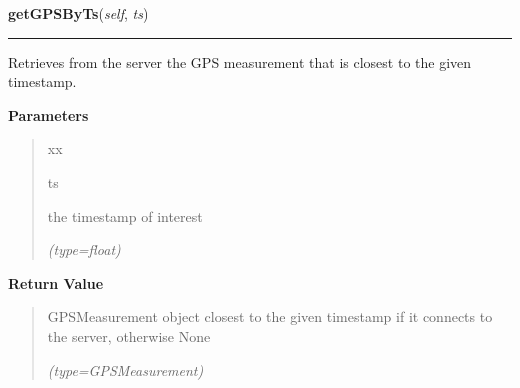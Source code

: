     \label{client_rest:ImagingInterface:getGPSByTs}

    \vspace{0.5ex}

\hspace{.8\funcindent}\begin{boxedminipage}{\funcwidth}

    \raggedright \textbf{getGPSByTs}(\textit{self}, \textit{ts})

    \vspace{-1.5ex}

    \rule{\textwidth}{0.5\fboxrule}
\setlength{\parskip}{2ex}
    Retrieves from the server the GPS measurement that is closest to the 
    given timestamp.

\setlength{\parskip}{1ex}
      \textbf{Parameters}
      \vspace{-1ex}

      \begin{quote}
        \begin{Ventry}{xx}

          \item[ts]

          the timestamp of interest

            {\it (type=float)}

        \end{Ventry}

      \end{quote}

      \textbf{Return Value}
    \vspace{-1ex}

      \begin{quote}
      GPSMeasurement object closest to the given timestamp if it connects 
      to the server, otherwise None

      {\it (type=GPSMeasurement)}

      \end{quote}

    \end{boxedminipage}

    \label{client_rest:ImagingInterface:getGPSById}

    \vspace{0.5ex}


